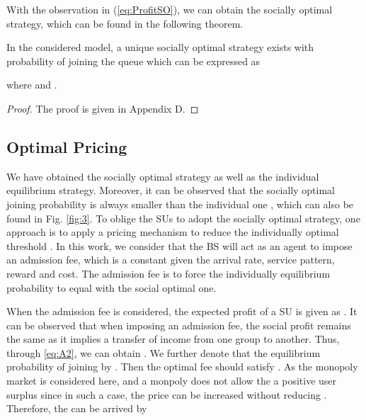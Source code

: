 \documentclass[journal]{IEEEtran}
\begin{document}
With the observation in (\ref{eq:ProfitSO}), we can obtain the
socially optimal strategy, which can be found in the following
theorem.


\begin{theorem}
In the considered model, a unique socially optimal strategy exists
with probability  of joining the queue which can be
expressed as


\noindent where  and .

\end{theorem}
\begin{proof}
The proof is given in Appendix D.
\end{proof}


\subsection{Optimal Pricing}

We have obtained the socially optimal strategy as well as the
individual equilibrium strategy. Moreover, it can be observed that
the socially optimal joining probability  is always smaller
than the individual one , which can also be found in Fig. \ref{fig:3}. To oblige the SUs to adopt the
socially optimal strategy, one approach is to apply a pricing
mechanism to reduce the individually optimal threshold 
\cite{HLi}. In this work, we consider that the BS will act as an
agent to impose an admission fee, which is a constant given the
arrival rate, service pattern, reward and cost. The admission fee
is to force the individually equilibrium probability to equal with
the social optimal one. \par

When the admission fee is considered, the expected profit of a SU
is given as . It can be
observed that when imposing an admission fee, the social profit
remains the same as it implies a transfer of income from one group
to another. Thus, through \ref{eq:A2}, we can obtain . We further denote that the equilibrium probability of
joining by . Then the optimal fee  should satisfy
. As the monopoly market is considered here,
and a monpoly does not allow the a positive user surplus since in
such a case, the price can be increased without reducing .
Therefore, the  can be arrived by
\end{document}
